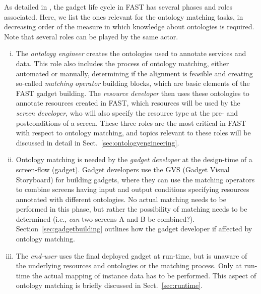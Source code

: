 As detailed in \cite{hoyer2009fast}, the gadget life cycle in FAST has several phases and roles associated. Here, we list the ones relevant for the ontology matching tasks, in decreasing order of the measure in which knowledge about ontologies is required. Note that several roles can be played by the same actor.
\begin{enumerate}[(i)]
    \item The \textit{ontology engineer} creates the ontologies used to annotate services and data. This role also includes the process of ontology matching, either automated or manually, determining if the alignment is feasible and creating so-called \emph{matching operator} building blocks, which are basic elements of the FAST gadget building. The \textit{resource developer} then uses these ontologies to annotate resources created in FAST, which resources will be used by the \textit{screen developer}, who will also specify the resource type at the pre- and postconditions of a screen. These three roles are the most critical in FAST with respect to ontology matching, and topics relevant to these roles will be discussed in detail in Sect.~\ref{sec:ontologyengineering}.
    \item Ontology matching is needed by the \textit{gadget developer} at the design-time of a screen-flow (gadget). Gadget developers use the GVS (Gadget Visual Storyboard) for building gadgets, where they can use the matching operators to combine screens having input and output conditions specifying resources annotated with different ontologies. No actual matching needs to be performed in this phase, but rather the possibility of matching needs to be determined (i.e., \emph{can} two screens A and B be combined?).
Section~\ref{sec:gadgetbuilding} outlines how the gadget developer if affected by ontology matching.
    \item The \textit{end-user} uses the final deployed gadget at run-time, but is unaware of the underlying resources and ontologies or the matching process. Only at run-time the actual mapping of instance data has to be performed.
This aspect of ontology matching is briefly discussed in Sect.~\ref{sec:runtime}.
\end{enumerate}


